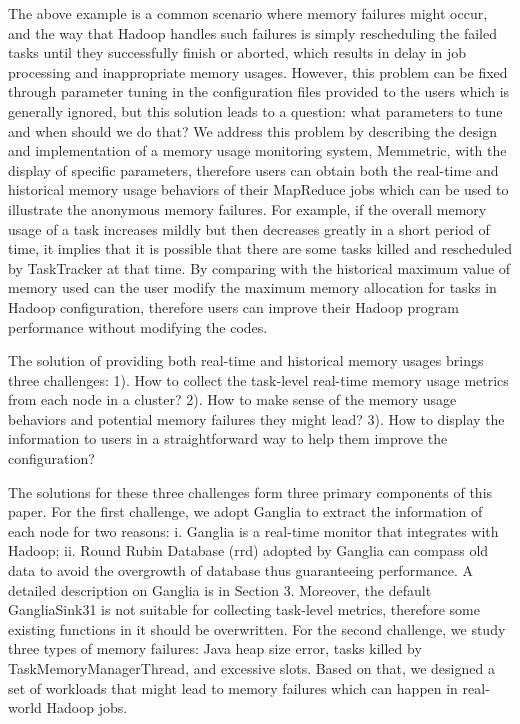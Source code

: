 The above example is a common scenario where memory failures might occur, and the way that Hadoop handles such failures is simply rescheduling the failed tasks until they successfully finish or aborted, which results in delay in job processing and inappropriate memory usages.
However, this problem can be fixed through parameter tuning in the configuration files provided to the users which is generally ignored, but this solution leads to a question: what parameters to tune and when should we do that? 
We address this problem by describing the design and implementation of a memory usage monitoring system, Memmetric, with the display of specific parameters, therefore users can obtain both the real-time and historical memory usage behaviors of their MapReduce jobs which can be used to illustrate the anonymous memory failures.
For example, if the overall memory usage of a task increases mildly but then decreases greatly in a short period of time, it implies that it is possible that there are some tasks killed and rescheduled by TaskTracker at that time.
By comparing with the historical maximum value of memory used can the user modify the maximum memory allocation for tasks in Hadoop configuration, therefore users can improve their Hadoop program performance without modifying the codes.
\par
The solution of providing both real-time and historical memory usages brings three challenges: 1). How to collect the task-level real-time memory usage metrics from each node in a cluster? 2). How to make sense of the memory usage behaviors and potential memory failures they might lead? 3). How to display the information to users in a straightforward way to help them improve the configuration?
\par
The solutions for these three challenges form three primary components of this paper. For the first challenge, we adopt Ganglia to extract the information of each node for two reasons: i. Ganglia is a real-time monitor that integrates with Hadoop; ii. Round Rubin Database (rrd) adopted by Ganglia can compass old data to avoid the overgrowth of database thus guaranteeing performance. A detailed description on Ganglia is in Section 3.
Moreover, the default GangliaSink31 is not suitable for collecting task-level metrics, therefore some existing functions in it should be overwritten.
For the second challenge, we study three types of memory failures: Java heap size error, tasks killed by TaskMemoryManagerThread, and excessive slots.
Based on that, we designed a set of workloads that might lead to memory failures which can happen in real-world Hadoop jobs.
